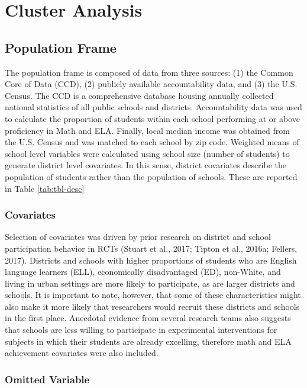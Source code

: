 \documentclass[floatsintext,man]{apa6}
\theoremstyle{definition}
\theoremstyle{definition}
\theoremstyle{definition}
\theoremstyle{remark}
\begin{document}
\section{Cluster Analysis}\label{cluster-analysis}

\subsection{Population Frame}\label{population-frame}

The population frame is composed of data from three sources: (1) the
Common Core of Data (CCD), (2) publicly available accountability data,
and (3) the U.S. Census. The CCD is a comprehensive database housing
annually collected national statistics of all public schools and
districts. Accountability data was used to calculate the proportion of
students within each school performing at or above proficiency in Math
and ELA. Finally, local median income was obtained from the U.S. Census
and was matched to each school by zip code. Weighted means of school
level variables were calculated using school size (number of students)
to generate district level covariates. In this sense, district
covariates describe the population of students rather than the
population of schools. These are reported in Table \ref{tab:tbl-desc}

\subsubsection{Covariates}\label{covariates}

Selection of covariates was driven by prior research on district and
school participation behavior in RCTs (Stuart et al., 2017; Tipton et
al., 2016a; Fellers, 2017). Districts and schools with higher
proportions of students who are English language learners (ELL),
economically disadvantaged (ED), non-White, and living in urban settings
are more likely to participate, as are larger districts and schools. It
is important to note, however, that some of these characteristics might
also make it more likely that researchers would recruit these districts
and schools in the first place. Anecdotal evidence from several research
teams also suggests that schools are less willing to participate in
experimental interventions for subjects in which their students are
already excelling, therefore math and ELA achievement covariates were
also included.

\subsubsection{Omitted Variable}\label{omitted-variable}
\end{document}
